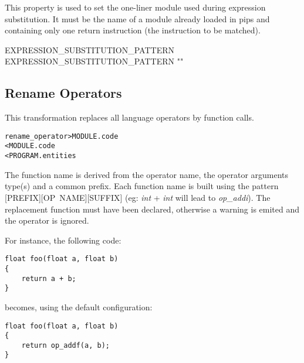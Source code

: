\documentclass[a4paper]{report}
\newenvironment{PipsMake}{\begin{alltt}}{\end{alltt}}
\newenvironment{PipsPass}[1]{\label{pass:#1}}{}
\begin{document}
This property is used to set the one-liner module used during
expression substitution. It must be the name of a module already
loaded in pips and containing only one return instruction (the
instruction to be matched).
\begin{PipsProp}{EXPRESSION_SUBSTITUTION_PATTERN}
EXPRESSION_SUBSTITUTION_PATTERN ""
\end{PipsProp}

\subsection{Rename Operators}

\begin{PipsPass}{rename_operator}
This transformation replaces all language operators by function calls.
\end{PipsPass}

\begin{PipsMake}
rename_operator > MODULE.code
                < MODULE.code
                < PROGRAM.entities
\end{PipsMake}

The function name is derived from the operator name, the operator
arguments type(s) and a common prefix. Each function name is built using
the pattern [PREFIX][OP~NAME][SUFFIX] (eg: \emph{int} + \emph{int}
will lead to \emph{op\_addi}). The replacement function must have been
declared, otherwise a warning is emited and the operator is ignored.

\vspace{5pt}
\begin{minipage}{\textwidth}
For instance, the following code:
\begin{lstlisting}
float foo(float a, float b)
{
    return a + b;
}
\end{lstlisting}
\end{minipage}

\vspace{5pt}
\begin{minipage}{\textwidth}
becomes, using the default configuration:
\begin{lstlisting}
float foo(float a, float b)
{
    return op_addf(a, b);
}
\end{lstlisting}
\end{minipage}
\end{document}

